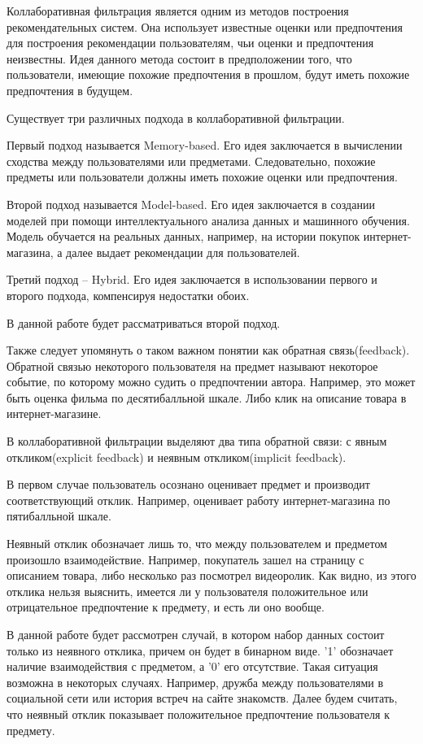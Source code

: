 \documentclass[14pt]{extarticle}
\begin{document}
Коллаборативная фильтрация является одним из методов построения рекомендательных систем. Она использует известные оценки или предпочтения  для построения рекомендации пользователям, чьи оценки и предпочтения неизвестны. Идея данного метода состоит в предположении того, что пользователи, имеющие похожие предпочтения в прошлом, будут иметь похожие предпочтения в будущем.



Существует три различных подхода в коллаборативной фильтрации.

Первый подход называется Memory-based. Его идея заключается в вычислении сходства между пользователями или предметами. Следовательно, похожие предметы или пользователи должны иметь похожие оценки или предпочтения.

Второй подход называется Model-based. Его идея заключается в создании моделей при помощи интеллектуального анализа данных и машинного обучения. Модель обучается на реальных данных, например, на истории покупок интернет-магазина, а далее выдает рекомендации для пользователей.

Третий подход -- Hybrid. Его идея заключается в использовании первого и второго подхода, компенсируя недостатки обоих. 


В данной работе будет рассматриваться второй подход.

Также следует упомянуть о таком важном понятии как обратная связь(feedback). Обратной связью некоторого пользователя на предмет называют некоторое событие, по которому можно судить о предпочтении автора. 
Например, это может быть оценка фильма по десятибалльной шкале. Либо клик на описание товара в интернет-магазине.

В коллаборативной фильтрации выделяют два типа обратной связи: с явным откликом(explicit feedback) и неявным откликом(implicit feedback).

 В первом случае пользователь осознано оценивает предмет и производит соответствующий отклик. Например,  оценивает работу интернет-магазина по пятибалльной шкале.

Неявный отклик  обозначает лишь то, что между пользователем и предметом произошло взаимодействие. Например, покупатель зашел на страницу с описанием товара, либо несколько раз посмотрел  видеоролик. Как видно, из этого отклика нельзя выяснить, имеется ли у пользователя положительное или отрицательное предпочтение к предмету, и есть ли оно вообще.

В данной работе будет рассмотрен случай, в котором набор данных состоит только из неявного отклика, причем он будет в бинарном виде. '1'  обозначает наличие взаимодействия с предметом, а '0' его отсутствие.  Такая ситуация возможна в некоторых случаях. Например, дружба между пользователями в социальной сети или история встреч на сайте знакомств. Далее будем считать, что неявный отклик показывает положительное предпочтение пользователя к предмету.
\end{document}
